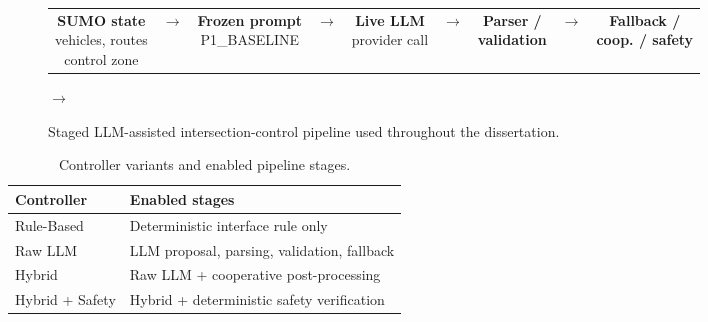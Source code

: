 \documentclass[letterpaper,10pt,conference]{ieeeconf}
\begin{document}
\begin{figure}[t]
\centering
\setlength{\fboxsep}{4pt}
\renewcommand{\arraystretch}{1.15}
\begin{tabular}{c c c c c c c c c}
\fbox{\parbox[c][1.15cm][c]{1.65cm}{\centering \textbf{SUMO state}\\vehicles, routes\\control zone}} &
$\rightarrow$ &
\fbox{\parbox[c][1.15cm][c]{1.70cm}{\centering \textbf{Frozen prompt}\\P1\_BASELINE}} &
$\rightarrow$ &
\fbox{\parbox[c][1.15cm][c]{1.55cm}{\centering \textbf{Live LLM}\\provider call}} &
$\rightarrow$ &
\fbox{\parbox[c][1.15cm][c]{1.70cm}{\centering \textbf{Parser /}\\\textbf{validation}}} &
$\rightarrow$ &
\fbox{\parbox[c][1.15cm][c]{1.80cm}{\centering \textbf{Fallback /}\\\textbf{coop. / safety}}}
\end{tabular}

\vspace{0.5em}

\hspace{0.5em}
$\rightarrow$
\hspace{0.5em}
\caption{Staged LLM-assisted intersection-control pipeline used throughout the dissertation.}
\label{fig:architecture}
\end{figure}

\begin{table}[t]
\centering
\caption{Controller variants and enabled pipeline stages.}
\label{tab:controllers}
\renewcommand{\arraystretch}{1.08}
\begin{tabular}{p{1.75cm} p{3.5cm}}
\toprule
\textbf{Controller} & \textbf{Enabled stages} \\
\midrule
Rule-Based & Deterministic interface rule only \\
Raw LLM & LLM proposal, parsing, validation, fallback \\
Hybrid & Raw LLM + cooperative post-processing \\
Hybrid + Safety & Hybrid + deterministic safety verification \\
\bottomrule
\end{tabular}
\end{table}
\end{document}
